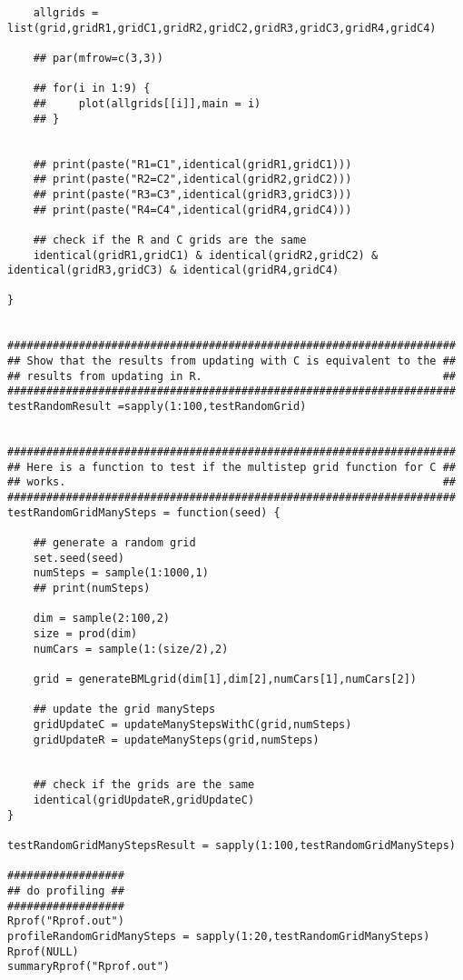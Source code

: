 \documentclass[11pt]{article}
\begin{document}
\begin{verbatim}
    allgrids = list(grid,gridR1,gridC1,gridR2,gridC2,gridR3,gridC3,gridR4,gridC4)

    ## par(mfrow=c(3,3))

    ## for(i in 1:9) {
    ##     plot(allgrids[[i]],main = i)
    ## }


    ## print(paste("R1=C1",identical(gridR1,gridC1)))
    ## print(paste("R2=C2",identical(gridR2,gridC2)))
    ## print(paste("R3=C3",identical(gridR3,gridC3)))
    ## print(paste("R4=C4",identical(gridR4,gridC4)))

    ## check if the R and C grids are the same
    identical(gridR1,gridC1) & identical(gridR2,gridC2) & identical(gridR3,gridC3) & identical(gridR4,gridC4)

}


#####################################################################
## Show that the results from updating with C is equivalent to the ##
## results from updating in R.                                     ##
#####################################################################
testRandomResult =sapply(1:100,testRandomGrid)


#####################################################################
## Here is a function to test if the multistep grid function for C ##
## works.                                                          ##
#####################################################################
testRandomGridManySteps = function(seed) {

    ## generate a random grid
    set.seed(seed)
    numSteps = sample(1:1000,1)
    ## print(numSteps)

    dim = sample(2:100,2)
    size = prod(dim)
    numCars = sample(1:(size/2),2)

    grid = generateBMLgrid(dim[1],dim[2],numCars[1],numCars[2])

    ## update the grid manySteps
    gridUpdateC = updateManyStepsWithC(grid,numSteps)
    gridUpdateR = updateManySteps(grid,numSteps)


    ## check if the grids are the same
    identical(gridUpdateR,gridUpdateC)
}

testRandomGridManyStepsResult = sapply(1:100,testRandomGridManySteps)

##################
## do profiling ##
##################
Rprof("Rprof.out")
profileRandomGridManySteps = sapply(1:20,testRandomGridManySteps)
Rprof(NULL)
summaryRprof("Rprof.out")
\end{verbatim}
\end{document}
